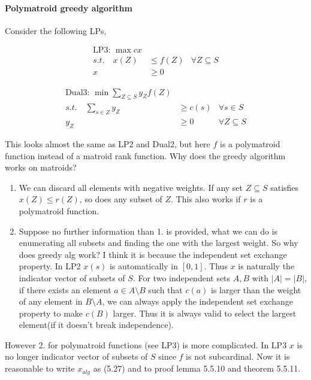 \documentclass[12pt]{article}
\begin{document}
\paragraph{Polymatroid greedy algorithm} Consider the following LPs,

\begin{minipage}{.45\textwidth}
\begin{align*}
    \text{LP3: } \max  cx\\
    s.t. \quad x(Z)&\leq f(Z) &\forall Z \subseteq S\\
                x&\geq 0
\end{align*}
\end{minipage}
\begin{minipage}{.45\textwidth}
    \begin{align*}
        \text{Dual3: } \min \sum_{Z\subseteq S} y_Z f(Z)\\
        s.t. \quad \sum_{s\in Z}y_Z&\geq c(s) & \forall s\in S\\
        y_Z&\geq 0 & \forall Z\subseteq S
    \end{align*}
\end{minipage}

This looks almost the same as LP2 and Dual2, but here $f$ is a polymatroid function instead of a matroid rank function. Why does the greedy algorithm works on matroids?

\begin{enumerate}
    \item We can discard all elements with negative weights. If any set $Z\subseteq S$ satisfies $x(Z)\leq r(Z)$, so does any subset of $Z$. This also works if $r$ is a polymatroid function.
    \item Suppose no further information than 1. is provided, what we can do is enumerating all subsets and finding the one with the largest weight. So why does greedy alg work? I think it is because the independent set exchange property. In LP2 $x(s)$ is automatically in $[0,1]$. Thus $x$ is naturally the indicator vector of subsets of $S$. For two independent sets $A,B$ with $|A|=|B|$, if there exists an element $a\in A\setminus B$ such that $c(a)$ is larger than the weight of any element in $B\setminus A$, we can always apply the independent set exchange property to make $c(B)$ larger. Thus it is always valid to select the largest element(if it doesn't break independence).
\end{enumerate}

However 2. for polymatroid functions (see LP3) is more complicated. In LP3 $x$ is no longer indicator vector of subsets of $S$ since $f$ is not subcardinal. Now it is reasonable to write $x_{alg}$ as (5.27) and to proof lemma 5.5.10 and theorem 5.5.11.
\end{document}

